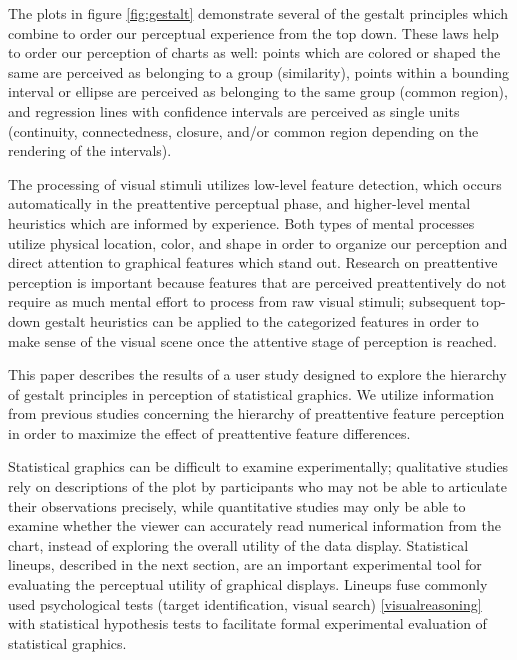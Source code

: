 \documentclass[11pt]{isuthesis}\usepackage[]{graphicx}\usepackage[]{color}
\begin{document}
The plots in figure \ref{fig:gestalt} demonstrate several of the gestalt principles which combine to order our perceptual experience from the top down. These laws help to order our perception of charts as well: points which are colored or shaped the same are perceived as belonging to a group (similarity), points within a bounding interval or ellipse are perceived as belonging to the same group (common region), and regression lines with confidence intervals are perceived as single units (continuity, connectedness, closure, and/or common region depending on the rendering of the intervals). 

The processing of visual stimuli utilizes low-level feature detection, which occurs automatically in the preattentive perceptual phase, and higher-level mental heuristics which are informed by experience. Both types of mental processes utilize physical location, color, and shape in order to organize our perception and direct attention to graphical features which stand out. 
Research on preattentive perception is important because features that are perceived preattentively do not require as much mental effort to process from raw visual stimuli; subsequent top-down gestalt heuristics can be applied to the categorized features in order to make sense of the visual scene once the attentive stage of perception is reached.

This paper describes the results of a user study designed to explore the hierarchy of gestalt principles in perception of statistical graphics. We utilize information from previous studies \citep{heer:2014, robinson:03} concerning the hierarchy of preattentive feature perception in order to maximize the effect of preattentive feature differences. 

Statistical graphics can be difficult to examine experimentally; qualitative studies rely on descriptions of the plot by participants who may not be able to articulate their observations precisely, while quantitative studies may only be able to examine whether the viewer can accurately read numerical information from the chart, instead of exploring the overall utility of the data display. Statistical lineups, described in the next section, are an important experimental tool for evaluating the perceptual utility of graphical displays. Lineups fuse commonly used psychological tests (target identification, visual search) \ref{visualreasoning} with statistical hypothesis tests to facilitate formal experimental evaluation of statistical graphics. 
\end{document}
